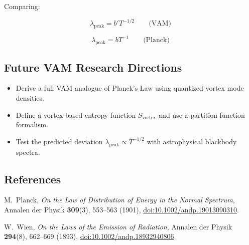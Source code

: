 Comparing:

\begin{equation}
\lambda_{\text{peak}} = b' T^{-1/2}
\qquad \text{(VAM)}
\end{equation}

\begin{equation}
\lambda_{\text{peak}} = b T^{-1}
\qquad \text{(Planck)}
\end{equation}

\subsection{Future VAM Research Directions}

\begin{itemize}
    \item Derive a full VAM analogue of Planck's Law using quantized vortex mode densities.
    \item Define a vortex-based entropy function \( S_{\text{vortex}} \) and use a partition function formalism.
    \item Test the predicted deviation \( \lambda_{\text{peak}} \propto T^{-1/2} \) with astrophysical blackbody spectra.
\end{itemize}

\subsection*{References}

\begin{thebibliography}{9}

M.~Planck,
\newblock \emph{On the Law of Distribution of Energy in the Normal Spectrum},
\newblock Annalen der Physik \textbf{309}(3), 553–563 (1901),
\newblock \href{https://doi.org/10.1002/andp.19013090310}{doi:10.1002/andp.19013090310}.

W.~Wien,
\newblock \emph{On the Laws of the Emission of Radiation},
\newblock Annalen der Physik \textbf{294}(8), 662–669 (1893),
\newblock \href{https://doi.org/10.1002/andp.18932940806}{doi:10.1002/andp.18932940806}.

\end{thebibliography}
